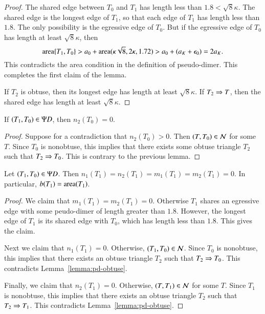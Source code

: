 \begin{proof}  The shared edge between $T_0$ and $T_1$ has length less than $1.8 < \sqrt8\kappa$.  The shared
edge is the longest edge of $T_1$, so that each edge of $T_1$ has length less than $1.8$.
The only possibility is the egressive edge of $T_0$.  But if the egressive edge of $T_0$ has length at least $\sqrt8\kappa$,
then
\[
{\operatorname{area}}\{T_1,T_0\} > a_0 + {\operatorname{area}}(\kappa\sqrt8,2\kappa,1.72) > a_0 + (a_K + \epsilon_0) = 2a_K.
\]
This contradicts the area condition in the definition of pseudo-dimer.  This completes the first claim of the lemma.

If $T_2$ is obtuse, then its longest edge has length at least $\sqrt8\kappa$.  If $T_2\Rightarrow T$, then the shared edge
has length at least $\sqrt8\kappa$.
\end{proof}

\begin{corollary}\label{lemma:pd-n2}
If $(T_1,T_0)\in\Psi D$, then $n_2(T_0)=0$.
\end{corollary}

\begin{proof} Suppose for a contradiction that $n_2(T_0)>0$.  Then $(T,T_0)\in \mathcal N$ for some $T$.  Since $T_0$ is
nonobtuse, this implies that there exists some obtuse triangle $T_2$ such that $T_2\Rightarrow T_0$.  This is contrary
to the previous lemma.
\end{proof}

\begin{lemma} Let $(T_1,T_0)\in\Psi D$.  Then $n_1(T_1)=n_2(T_1)=m_1(T_1)=m_2(T_1)=0$.  In particular,
$b(T_1) = {\operatorname{area}}(T_1)$.
\end{lemma}

\begin{proof}  We claim that $m_1(T_1)=m_2(T_1)=0$.  Otherwise $T_1$ shares an egressive edge with some
peudo-dimer of length greater than $1.8$.  However, the longest edge of $T_1$ is its shared edge with $T_0$, which
has length less than $1.8$.  This gives the claim.

Next we claim that $n_1(T_1)=0$.  Otherwise, $(T_1,T_0)\in \mathcal N$.  Since $T_0$ is nonobtuse, this implies
that there exists an obtuse triangle $T_2$ such that $T_2\Rightarrow T_0$.  This contradicts Lemma~\ref{lemma:pd-obtuse}.

Finally, we claim that $n_2(T_1)=0$.  Otherwise, $(T,T_1)\in \mathcal N$ for some $T$.  Since $T_1$ is nonobtuse,
this implies that there exists an obtuse triangle $T_2$ such that $T_2\Rightarrow T_1$.  This contradicts
Lemma~\ref{lemma:pd-obtuse}.
\end{proof}

